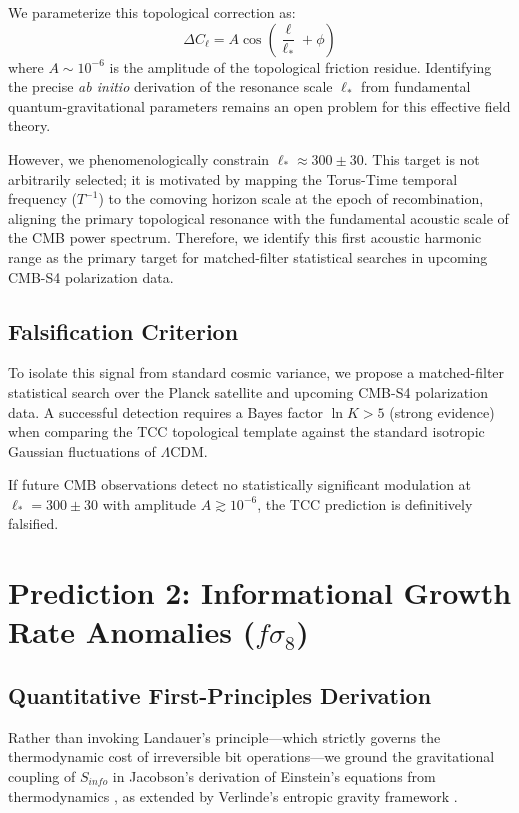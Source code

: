 \documentclass[12pt,openany]{book}
\theoremstyle{plain}
\theoremstyle{definition}
\theoremstyle{remark}
\begin{document}
We parameterize this topological correction as:
$$ \Delta C_\ell = A \cos \left( \frac{\ell}{\ell_*} + \phi \right) $$
where $A \sim 10^{-6}$ is the amplitude of the topological friction residue. Identifying the precise \textit{ab initio} derivation of the resonance scale $\ell_*$ from fundamental quantum-gravitational parameters remains an open problem for this effective field theory. 

However, we phenomenologically constrain $\ell_* \approx 300 \pm 30$. This target is not arbitrarily selected; it is motivated by mapping the Torus-Time temporal frequency ($T^{-1}$) to the comoving horizon scale at the epoch of recombination, aligning the primary topological resonance with the fundamental acoustic scale of the CMB power spectrum. Therefore, we identify this first acoustic harmonic range as the primary target for matched-filter statistical searches in upcoming CMB-S4 polarization data.

\section{Falsification Criterion}

To isolate this signal from standard cosmic variance, we propose a matched-filter statistical search over the Planck satellite and upcoming CMB-S4 polarization data. A successful detection requires a Bayes factor $\ln K > 5$ (strong evidence) when comparing the TCC topological template against the standard isotropic Gaussian fluctuations of $\Lambda$CDM. 

If future CMB observations detect no statistically significant modulation at $\ell_* = 300 \pm 30$ with amplitude $A \gtrsim 10^{-6}$, the TCC prediction is definitively falsified.

\chapter{Prediction 2: Informational Growth Rate Anomalies ($f\sigma_8$)}

\section{Quantitative First-Principles Derivation}

Rather than invoking Landauer's principle—which strictly governs the thermodynamic cost of irreversible bit operations—we ground the gravitational coupling of $S_{info}$ in Jacobson's derivation of Einstein's equations from thermodynamics \cite{jacobson1995}, as extended by Verlinde's entropic gravity framework \cite{verlinde2011}.
\end{document}
